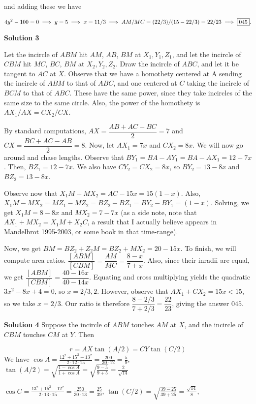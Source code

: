 \documentclass[a4paper,11pt]{article}
\begin{document}
and adding these we have

\[4y^2 - 100 = 0\implies y = 5\implies x = 11/3 \\ \implies AM/MC = (22/3)/(15 - 22/3) = 22/23 \implies \boxed{045}.\]

\textbf{Solution 3}

Let the incircle of $ABM$ hit $AM$, $AB$, $BM$ at $X_{1},Y_{1},Z_{1}$, and let the incircle of $CBM$ hit $MC$, $BC$, $BM$ at $X_{2},Y_{2},Z_{2}$. Draw the incircle of $ABC$, and let it be tangent to $AC$ at $X$. Observe that we have a homothety centered at A sending the incircle of $ABM$ to that of $ABC$, and one centered at $C$ taking the incircle of $BCM$ to that of $ABC$. These have the same power, since they take incircles of the same size to the same circle. Also, the power of the homothety is $AX_{1}/AX=CX_{2}/CX$.

By standard computations, $AX=\dfrac{AB+AC-BC}{2}=7$ and $CX=\dfrac{BC+AC-AB}{2}=8$. Now, let $AX_{1}=7x$ and $CX_{2}=8x$. We will now go around and chase lengths. Observe that $BY_{1}=BA-AY_{1}=BA-AX_{1}=12-7x$. Then, $BZ_{1}=12-7x$. We also have $CY_{2}=CX_{2}=8x$, so $BY_{2}=13-8x$ and $BZ_{2}=13-8x$.

Observe now that $X_{1}M+MX_{2}=AC-15x=15(1-x)$. Also,$X_{1}M-MX_{2}=MZ_{1}-MZ_{2}=BZ_{2}-BZ_{1}=BY_{2}-BY_{1}=(1-x)$. Solving, we get $X_{1}M=8-8x$ and $MX_{2}=7-7x$ (as a side note, note that $AX_{1}+MX_{2}=X_{1}M+X_{2}C$, a result that I actually believe appears in Mandelbrot 1995-2003, or some book in that time-range).

Now, we get $BM=BZ_{2}+Z_{2}M=BZ_{2}+MX_{2}=20-15x$. To finish, we will compute area ratios. $\dfrac{[ABM]}{[CBM]}=\dfrac{AM}{MC}=\dfrac{8-x}{7+x}$. Also, since their inradii are equal, we get $\dfrac{[ABM]}{[CBM]}=\dfrac{40-16x}{40-14x}$. Equating and cross multiplying yields the quadratic $3x^{2}-8x+4=0$, so $x=2/3,2$. However, observe that $AX_{1}+CX_{2}=15x<15$, so we take $x=2/3$. Our ratio is therefore $\dfrac{8-2/3}{7+2/3}=\dfrac{22}{23}$, giving the answer $\boxed{045}$.

\textbf{Solution 4}
Suppose the incircle of $ABM$ touches $AM$ at $X$, and the incircle of $CBM$ touches $CM$ at $Y$. Then

\[r = AX \tan(A/2) = CY \tan(C/2)\]
We have $\cos A = \frac{12^2+15^2-13^2}{2\cdot 12\cdot 15} = \frac{200}{30\cdot 12}=\frac{5}{9}$, $\tan(A/2) = \sqrt{\frac{1-\cos A}{1+\cos A}} = \sqrt{\frac{9-5}{9+5}} = \frac{2}{\sqrt{14}}$

$\cos C = \frac{13^2+15^2-12^2}{2\cdot 13\cdot 15} = \frac{250}{30\cdot 13} = \frac{25}{39}$, $\tan(C/2) = \sqrt{\frac{39-25}{39+25}}=\frac{\sqrt{14}}{8}$,
\end{document}
